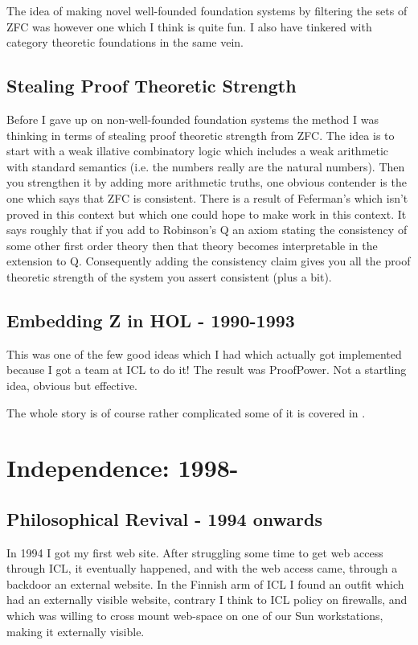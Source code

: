 The idea of making novel well-founded foundation systems by filtering the sets of ZFC was however one which I think is quite fun.
I also have tinkered with category theoretic foundations in the same vein.

\section{Stealing Proof Theoretic Strength}

Before I gave up on non-well-founded foundation systems the method I was thinking in terms of stealing proof theoretic strength from ZFC.
The idea is to start with a weak illative combinatory logic which includes a weak arithmetic with standard semantics (i.e. the numbers really are the natural numbers).
Then you strengthen it by adding more arithmetic truths, one obvious contender is the one which says that ZFC is consistent.
There is a result of Feferman's which isn't proved in this context but which one could hope to make work in this context.
It says roughly that if you add to Robinson's Q an axiom stating the consistency of some other first order theory then that theory becomes interpretable in the extension to Q.
Consequently adding the consistency claim gives you all the proof theoretic strength of the system you assert consistent (plus a bit).

\section{Embedding Z in HOL - 1990-1993}

This was one of the few good ideas which I had which actually got implemented because I got a team at ICL to do it!
The result was ProofPower.
Not a startling idea, obvious but effective.

The whole story is of course rather complicated some of it is covered in \cite{rbjt014, rbjt015}.

\chapter{Independence: 1998-}

\section{Philosophical Revival - 1994 onwards}

In 1994 I got my first web site.
After struggling some time to get web access through ICL, it eventually happened, and with the web access came, through a backdoor an external website.
In the Finnish arm of ICL I found an outfit which had an externally visible website, contrary I think to ICL policy on firewalls, and which was willing to cross mount web-space on one of our Sun workstations, making it externally visible.


